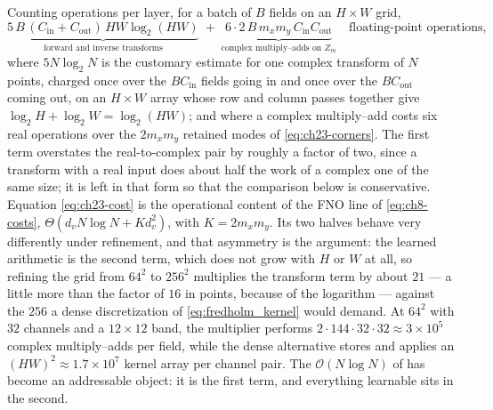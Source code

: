 Counting operations per layer, for a batch of $B$ fields on an $H \times W$
grid,
\begin{equation}
  \label{eq:ch23-cost}
  \underbrace{5\,B\,(C_{\text{in}} + C_{\text{out}})\,HW \log_2(HW)}_{\text{forward and inverse transforms}}
  \;+\;
  \underbrace{6 \cdot 2\, B\, m_x m_y\, C_{\text{in}} C_{\text{out}}}_{\text{complex multiply--adds on } Z_m}
  \quad \text{floating-point operations},
\end{equation}
where $5N\log_2 N$ is the customary estimate for one complex transform of $N$
points, charged once over the $B C_{\text{in}}$ fields going in and once over
the $B C_{\text{out}}$ coming out, on an $H \times W$ array whose row and column
passes together give $\log_2 H + \log_2 W = \log_2(HW)$; and where a complex
multiply--add costs six real operations over the $2m_xm_y$ retained modes of
\eqref{eq:ch23-corners}. The first term overstates the real-to-complex pair by
roughly a factor of two, since a transform with a real input does about half the
work of a complex one of the same size; it is left in that form so that the
comparison below is conservative.
Equation \eqref{eq:ch23-cost} is the operational content of the FNO line of
\eqref{eq:ch8-costs}, $\Theta(d_v N \log N + K d_v^2)$, with $K = 2m_xm_y$. Its
two halves behave very differently under refinement, and that asymmetry is the
argument: the learned arithmetic is the second term, which does not grow with
$H$ or $W$ at all, so refining the grid from $64^2$ to $256^2$ multiplies the
transform term by about $21$ --- a little more than the factor of $16$ in points,
because of the logarithm --- against the $256$ a dense discretization of
\eqref{eq:fredholm_kernel} would demand. At $64^2$ with $32$ channels and a
$12 \times 12$ band, the multiplier performs
$2 \cdot 144 \cdot 32 \cdot 32 \approx 3 \times 10^{5}$ complex multiply--adds
per field, while the dense alternative stores and applies an
$(HW)^2 \approx 1.7 \times 10^{7}$ kernel array per channel pair. The
$\mathcal{O}(N \log N)$ of
 has become an
addressable object: it is the first term, and everything learnable sits in the
second.

